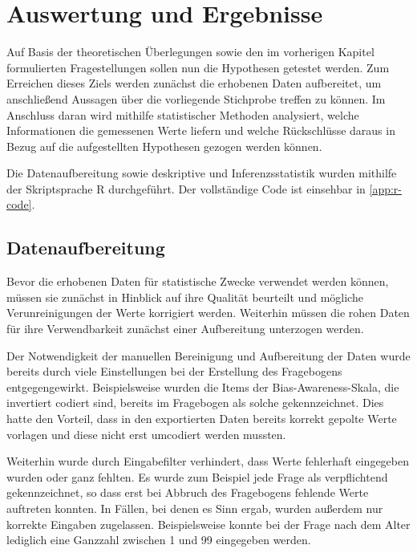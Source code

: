 \chapter{Auswertung und Ergebnisse}
\label{ch:auswertung-ergebnisse}

Auf Basis der theoretischen Überlegungen sowie den im vorherigen Kapitel formulierten Fragestellungen sollen nun die Hypothesen getestet werden.
Zum Erreichen dieses Ziels werden zunächst die erhobenen Daten aufbereitet, um anschließend Aussagen über die vorliegende Stichprobe treffen zu können.
Im Anschluss daran wird mithilfe statistischer Methoden analysiert, welche Informationen die gemessenen Werte liefern und welche Rückschlüsse daraus in Bezug auf die aufgestellten Hypothesen gezogen werden können.

Die Datenaufbereitung sowie deskriptive und Inferenzsstatistik wurden mithilfe der Skriptsprache R durchgeführt.
Der vollständige Code ist einsehbar in \autoref{app:r-code}.


\section{Datenaufbereitung}
\label{sec:datenaufbereitung}

Bevor die erhobenen Daten für statistische Zwecke verwendet werden können, müssen sie zunächst in Hinblick auf ihre Qualität beurteilt und mögliche Verunreinigungen der Werte korrigiert werden.
Weiterhin müssen die rohen Daten für ihre Verwendbarkeit zunächst einer Aufbereitung unterzogen werden.

Der Notwendigkeit der manuellen Bereinigung und Aufbereitung der Daten wurde bereits durch viele Einstellungen bei der Erstellung des Fragebogens entgegengewirkt.
Beispielsweise wurden die Items der Bias-Awareness-Skala, die invertiert codiert sind, bereits im Fragebogen als solche gekennzeichnet.
Dies hatte den Vorteil, dass in den exportierten Daten bereits korrekt gepolte Werte vorlagen und diese nicht erst umcodiert werden mussten.

Weiterhin wurde durch Eingabefilter verhindert, dass Werte fehlerhaft eingegeben wurden oder ganz fehlten.
Es wurde zum Beispiel jede Frage als verpflichtend gekennzeichnet, so dass erst bei Abbruch des Fragebogens fehlende Werte auftreten konnten.
In Fällen, bei denen es Sinn ergab, wurden außerdem nur korrekte Eingaben zugelassen.
Beispielsweise konnte bei der Frage nach dem Alter lediglich eine Ganzzahl zwischen 1 und 99 eingegeben werden.

